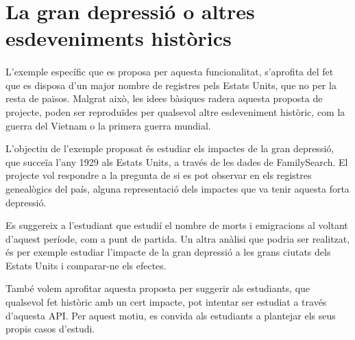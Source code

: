 \section{La gran depressió o altres esdeveniments històrics}

    \paragraph{}
    L'exemple específic que es proposa per aquesta funcionalitat, s'aprofita del fet que es disposa d'un major nombre de registres pels Estats Units, que no per la resta de països. Malgrat això, les idees bàsiques radera aquesta proposta de projecte, poden ser reproduïdes per qualsevol altre esdeveniment històric, com la guerra del Vietnam o la primera guerra mundial.

    L'objectiu de l'exemple proposat és estudiar els impactes de la gran depressió, que succeïa l'any 1929 als Estats Units, a través de les dades de FamilySearch. El projecte vol respondre a la pregunta de si es pot observar en els registres genealògics del país, alguna representació dels impactes que va tenir aquesta forta depressió.

    Es suggereix a l'estudiant que estudií el nombre de morts i emigracions al voltant d'aquest període, com a punt de partida. Un altra anàlisi que podria ser realitzat, és per exemple estudiar l’impacte de la gran depressió a les grans ciutats dels Estats Units i comparar-ne els efectes.

    També volem aprofitar aquesta proposta per suggerir als estudiants, que qualsevol fet històric amb un cert impacte, pot intentar ser estudiat a través d'aquesta API. Per aquest motiu, es convida als estudiants a plantejar els seus propis casos d'estudi.
